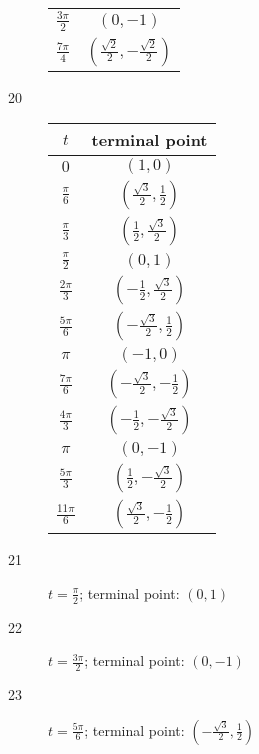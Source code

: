 \documentclass{exam}
\begin{document}
\begin{description}
\begin{tabular}{cc}
          $\frac{3 \pi}{2}$ & $\left( 0, -1 \right)$ \\
          $\frac{7 \pi}{4}$ & $\left( \frac{\sqrt{2}}{2}, -\frac{\sqrt{2}}{2} \right)$ \\
          \bottomrule
        \end{tabular}

      \item[20]
        \begin{tabular}{cc}
          \toprule
          $t$ & terminal point \\
          \midrule
          $0$             & $(1, 0)$ \\
          $\frac{\pi}{6}$ & $\left( \frac{\sqrt{3}}{2}, \frac{1}{2} \right)$ \\
          $\frac{\pi}{3}$ & $\left( \frac{1}{2}, \frac{\sqrt{3}}{2} \right)$ \\

          \midrule
          $\frac{\pi}{2}$   & $(0, 1)$ \\
          $\frac{2 \pi}{3}$ & $\left( -\frac{1}{2}, \frac{\sqrt{3}}{2} \right)$ \\
          $\frac{5 \pi}{6}$ & $\left( -\frac{\sqrt{3}}{2}, \frac{1}{2} \right)$ \\

          \midrule
          $\pi$             & $(-1, 0)$ \\
          $\frac{7 \pi}{6}$ & $\left( -\frac{\sqrt{3}}{2}, -\frac{1}{2} \right)$ \\
          $\frac{4 \pi}{3}$ & $\left( -\frac{1}{2}, -\frac{\sqrt{3}}{2} \right)$ \\

          \midrule
          $\pi$              & $(0, -1)$ \\
          $\frac{5 \pi}{3}$  & $\left( \frac{1}{2}, -\frac{\sqrt{3}}{2} \right)$ \\
          $\frac{11 \pi}{6}$ & $\left( \frac{\sqrt{3}}{2}, -\frac{1}{2} \right)$ \\
          
          \bottomrule
        \end{tabular}

      \item[21] $t = \frac{\pi}{2}$; terminal point: $\boxed{ \left( 0, 1 \right) }$

      \item[22] $t = \frac{3 \pi}{2}$; terminal point: $\boxed{ \left( 0, -1 \right) }$

      \item[23] $t = \frac{5 \pi}{6}$; terminal point: $\boxed{ \left( - \frac{\sqrt{3}}{2}, \frac{1}{2} \right) }$


\end{description}
\end{document}
